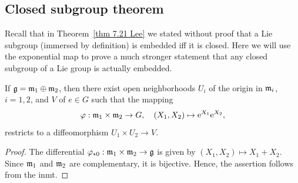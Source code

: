 \subsection{Closed subgroup theorem}


Recall that in Theorem~\ref{thm 7.21 Lee} we stated without proof that a Lie subgroup (immersed by definition) is embedded iff it is closed. Here we will use the exponential map to prove a much stronger statement that any closed subgroup of a Lie group is actually embedded.


\begin{lem}[{{\cite[Lem.~5.6.7]{RS1}}}]\label{lem 5.6.7 RS1}
    If $\mathfrak{g}=\mathfrak{m}_1\oplus\mathfrak{m}_2$, then there exist open neighborhoods $U_i$ of the origin in $\mathfrak{m}_i$, $i=1,2$, and $V$ of $e\in G$ such that the mapping
    \[\varphi:\mathfrak{m}_1\times\mathfrak{m}_2\to G,\quad (X_1,X_2)\mapsto \mathrm{e}^{X_1}\mathrm{e}^{X_2},\]
    restricts to a diffeomorphism $U_1\times U_2\to V$.
\end{lem}
\begin{proof}
    The differential $\varphi_{\ast 0}:\mathfrak{m}_1\times\mathfrak{m}_2\to\mathfrak{g}$ is given by $(X_1,X_2)\mapsto X_1+X_2$. Since $\mathfrak{m}_1$ and $\mathfrak{m}_2$ are complementary, it is bijective. Hence, the assertion follows from the \gls{inmt}.
\end{proof}


